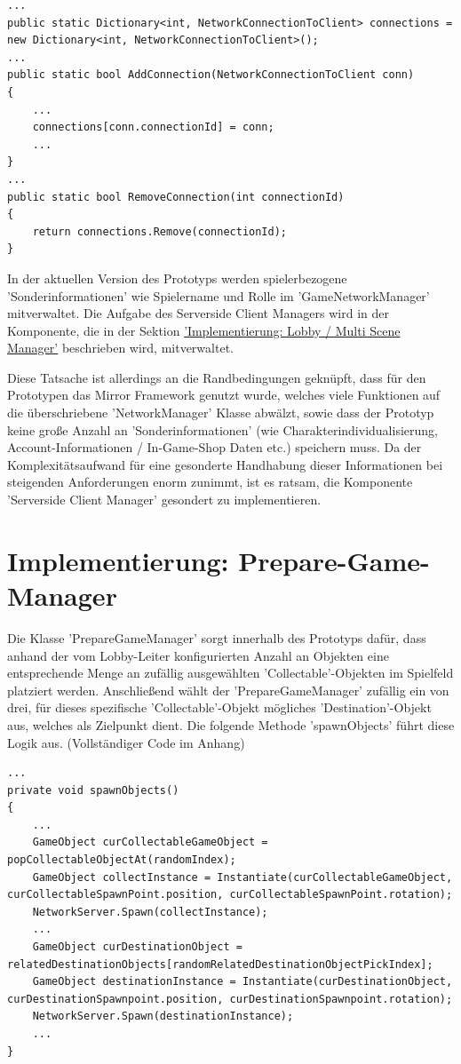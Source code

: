 \begin{lstlisting}[caption= Mirror Class NetworkServer.cs Connection Handling]
...
public static Dictionary<int, NetworkConnectionToClient> connections = new Dictionary<int, NetworkConnectionToClient>();
...
public static bool AddConnection(NetworkConnectionToClient conn)
{
	...
	connections[conn.connectionId] = conn;
	...
}
...
public static bool RemoveConnection(int connectionId)
{
	return connections.Remove(connectionId);
}
\end{lstlisting}

In der aktuellen Version des Prototyps werden spielerbezogene 'Sonderinformationen' wie Spielername und Rolle im 'GameNetworkManager'  mitverwaltet. Die Aufgabe des Serverside Client Managers wird in der Komponente, die in der Sektion \hyperref[Lobby Manager Implementierung]{'Implementierung: Lobby / Multi Scene Manager'} beschrieben wird, mitverwaltet. 

Diese Tatsache ist allerdings an die Randbedingungen geknüpft, dass für den Prototypen das Mirror Framework genutzt wurde, welches viele Funktionen auf die überschriebene 'NetworkManager' Klasse abwälzt, sowie dass der Prototyp keine große Anzahl an 'Sonderinformationen' (wie Charakterindividualisierung, Account-Informationen / In-Game-Shop Daten etc.) speichern muss. Da der Komplexitätsaufwand für eine gesonderte Handhabung dieser Informationen bei steigenden Anforderungen enorm zunimmt, ist es ratsam, die Komponente 'Serverside Client Manager' gesondert zu implementieren.

\section{Implementierung: Prepare-Game-Manager}
\label{Implementierung:prepare_game_manager}

Die Klasse 'PrepareGameManager' sorgt innerhalb des Prototyps dafür, dass anhand der vom Lobby-Leiter konfigurierten Anzahl an Objekten eine entsprechende Menge an zufällig ausgewählten 'Collectable'-Objekten im Spielfeld platziert werden. Anschließend wählt der 'PrepareGameManager' zufällig ein von drei, für dieses spezifische 'Collectable'-Objekt mögliches 'Destination'-Objekt aus, welches als Zielpunkt dient. Die folgende Methode 'spawnObjects' führt diese Logik aus. (Vollständiger Code im Anhang)

\begin{lstlisting}[caption= PrepareGameManager.cs Variablen und spawnObjects()]
...
private void spawnObjects()
{	
	...	
	GameObject curCollectableGameObject = popCollectableObjectAt(randomIndex);
	GameObject collectInstance = Instantiate(curCollectableGameObject, curCollectableSpawnPoint.position, curCollectableSpawnPoint.rotation);
	NetworkServer.Spawn(collectInstance);
	...
	GameObject curDestinationObject = relatedDestinationObjects[randomRelatedDestinationObjectPickIndex];
	GameObject destinationInstance = Instantiate(curDestinationObject, curDestinationSpawnpoint.position, curDestinationSpawnpoint.rotation);
	NetworkServer.Spawn(destinationInstance);
	...
}
\end{lstlisting}

